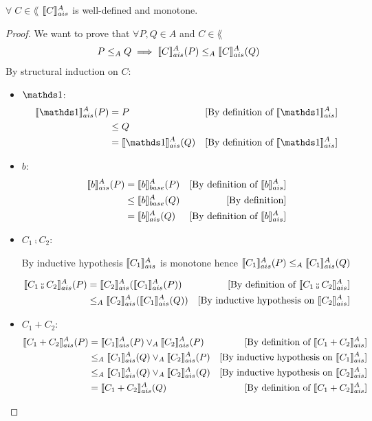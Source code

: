 \documentclass[
  10pt,       %
  twoside,    %
  a4paper,    %
  english,    %
  tikz,       %
  openright,  %
]{book}
\begin{document}
\begin{theorem}[Monotonicity]
  \label{thm:asem-mono} 
  $\forall \; C \in \lang$ $\llbracket C \rrbracket_{ais}^{A}$ is well-defined and monotone.
\end{theorem}
\begin{proof}
  We want to prove that $\forall P, Q \in A$ and $C \in \lang$
  $$P \leq_A Q \implies \llbracket C \rrbracket_{ais}^{A}(P) \leq_A \llbracket C \rrbracket_{ais}^{A}(Q)$$
  By structural induction on $C$:
  \begin{itemize}
    \item $\sskip$:
      \begin{align*}
        \asem{\sskip}(P) 
          &= P 
          & \text{[By definition of $\asem{\sskip}$]}\\
          &\leq Q \\
          &= \asem{\sskip}(Q) 
          & \text{[By definition of $\asem{\sskip}$]}\\
      \end{align*}

    \item $b$:
      \begin{align*}
        \llbracket b \rrbracket_{ais}^{A}(P) 
          &= \llbracket b \rrbracket_{base}^A(P)
          & \text{[By definition of $\llbracket b \rrbracket_{ais}^{A}$]}\\
          &\leq \llbracket b \rrbracket_{base}^A(Q)
          & \text{[By definition]}\\
          &= \llbracket b \rrbracket_{ais}^{A}(Q) 
          & \text{[By definition of $\llbracket b \rrbracket_{ais}^{A}$]}\\
      \end{align*}

    \item $C_1 \fcmp C_2$:

      By inductive hypothesis $\llbracket C_1 \rrbracket_{ais}^{A}$ is monotone hence
      $\llbracket C_1 \rrbracket_{ais}^{A}(P) \leq_A \llbracket C_1 \rrbracket_{ais}^{A}(Q)$

      \begin{align*}
        \asem{C_1 \fcmp C_2}(P) 
          &= \asem{C_2}(\asem{C_1}(P))
          &\text{[By definition of $\asem{C_1 \fcmp C_2}$]}\\
          &\leq_A \asem{C_2}(\asem{C_1}(Q))
          &\text{[By inductive hypothesis on $\asem{C_2}$]} \\
      \end{align*}
  
    \item $C_1 + C_2$:
      \begin{align*}
        \llbracket C_1 + C_2 \rrbracket_{ais}^{A}(P) 
          &= \llbracket C_1 \rrbracket_{ais}^{A}(P) \lor_A \llbracket C_2 \rrbracket_{ais}^{A}(P)
          &\text{[By definition of $\llbracket C_1 + C_2 \rrbracket_{ais}^{A}$]}\\
          &\leq_A \llbracket C_1 \rrbracket_{ais}^{A}(Q) \lor_A \llbracket C_2 \rrbracket_{ais}^{A}(P)
          &\text{[By inductive hypothesis on $\llbracket C_1 \rrbracket_{ais}^{A}$]} \\
          &\leq_A \llbracket C_1 \rrbracket_{ais}^{A}(Q) \lor_A \llbracket C_2 \rrbracket_{ais}^{A}(Q)
          &\text{[By inductive hypothesis on $\llbracket C_2 \rrbracket_{ais}^{A}$]} \\
          &= \llbracket C_1 + C_2 \rrbracket_{ais}^{A}(Q) 
          &\text{[By definition of $\llbracket C_1 + C_2 \rrbracket_{ais}^{A}$]}\\
      \end{align*}
    

\end{itemize}
\end{proof}
\end{document}
